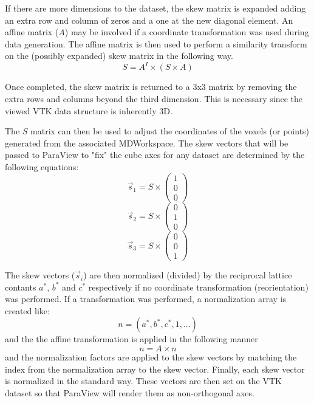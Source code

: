 \documentclass[11pt]{article}
\numberwithin{equation}{section}
\numberwithin{figure}{section}
\begin{document}
If there are more dimensions to the dataset, the skew matrix is expanded adding an extra row and column of zeros and a one at the new diagonal element. An affine matrix ($A$) may be involved if a coordinate transformation was used during data generation. The affine matrix is then used to perform a similarity transform on the (possibly expanded) skew matrix in the following way.
\begin{equation}
S = A^{I} \times (S \times A)
\end{equation}

Once completed, the skew matrix is returned to a 3x3 matrix by removing the extra rows and columns beyond the third dimension. This is necessary since the viewed VTK data structure is inherently 3D. 

The $S$ matrix can then be used to adjust the coordinates of the voxels (or points) generated from the associated MDWorkspace. The skew vectors that will be passed to ParaView to "fix" the cube axes for any dataset are determined by the following equations:
\begin{equation}
\vec{s}_1 = S \times \left(\begin{array}{c}1\\0\\0\end{array}\right)
\end{equation}
\begin{equation}
\vec{s}_2 = S \times \left(\begin{array}{c}0\\1\\0\end{array}\right)
\end{equation}
\begin{equation}
\vec{s}_3 = S \times \left(\begin{array}{c}0\\0\\1\end{array}\right)
\end{equation}

The skew vectors ($\vec{s}_i$) are then normalized (divided) by the reciprocal lattice contants $a^*$, $b^*$ and $c^*$ respectively if no coordinate transformation (reorientation) was performed. If a transformation was performed, a normalization array is created like: 
\begin{equation}
n = (a^*, b^*, c^*, 1, ...)
\end{equation}
and the the affine transformation is applied in the following manner
\begin{equation}
n = A \times n
\end{equation}
and the normalization factors are applied to the skew vectors by matching the index from the normalization array to the skew vector. Finally, each skew vector is normalized in the standard way. These vectors are then set on the VTK dataset so that ParaView will render them as non-orthogonal axes.
\end{document}
